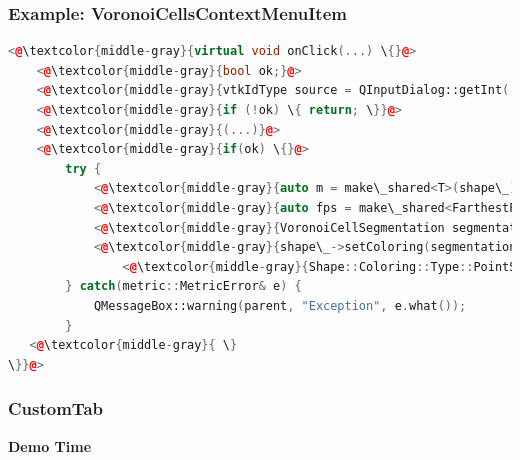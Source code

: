 \documentclass[compress]{beamer}
\begin{document}
\begin{frame}[fragile]
  \frametitle{Example: VoronoiCellsContextMenuItem}

\begin{lstlisting}[language=C++,keywordstyle=\color{blue},
                stringstyle=\color{red},
                commentstyle=\color{green},  numbers=none]
<@\textcolor{middle-gray}{virtual void onClick(...) \{}@>
    <@\textcolor{middle-gray}{bool ok;}@>
    <@\textcolor{middle-gray}{vtkIdType source = QInputDialog::getInt(...);}@>
    <@\textcolor{middle-gray}{if (!ok) \{ return; \}}@>
    <@\textcolor{middle-gray}{(...)}@>
    <@\textcolor{middle-gray}{if(ok) \{}@>
        try {
            <@\textcolor{middle-gray}{auto m = make\_shared<T>(shape\_);}@>
            <@\textcolor{middle-gray}{auto fps = make\_shared<FarthestPointSampling>(shape\_, m, source, numberOfSegments);}@>
            <@\textcolor{middle-gray}{VoronoiCellSegmentation segmentation(shape\_, m, fps);}@>
            <@\textcolor{middle-gray}{shape\_->setColoring(segmentation.getSegments(), }@>
            	<@\textcolor{middle-gray}{Shape::Coloring::Type::PointSegmentation);}@>
        } catch(metric::MetricError& e) {
            QMessageBox::warning(parent, "Exception", e.what());
        }
   <@\textcolor{middle-gray}{ \}
\}}@>
\end{lstlisting}

\end{frame}

\begin{frame}
	\frametitle{CustomTab}
	
	\bf{Demo Time}
	
\end{frame}
\end{document}
